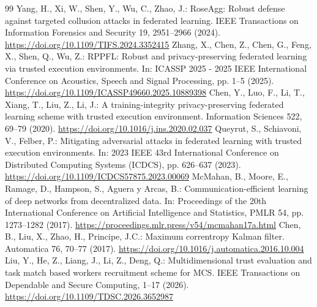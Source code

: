 \documentclass[10pt,a4paper,UTF8,fontset=fandol]{ctexart}
\begin{document}
\begin{thebibliography}{99}
     Yang, H., Xi, W., Shen, Y., Wu, C., Zhao, J.: RoseAgg: Robust defense against targeted collusion attacks in federated learning. IEEE Transactions on Information Forensics and Security 19, 2951--2966 (2024). \url{https://doi.org/10.1109/TIFS.2024.3352415}
     Zhang, X., Chen, Z., Chen, G., Feng, X., Shen, Q., Wu, Z.: RPPFL: Robust and privacy-preserving federated learning via trusted execution environments. In: ICASSP 2025 - 2025 IEEE International Conference on Acoustics, Speech and Signal Processing, pp. 1--5 (2025). \url{https://doi.org/10.1109/ICASSP49660.2025.10889398}
     Chen, Y., Luo, F., Li, T., Xiang, T., Liu, Z., Li, J.: A training-integrity privacy-preserving federated learning scheme with trusted execution environment. Information Sciences 522, 69--79 (2020). \url{https://doi.org/10.1016/j.ins.2020.02.037}
     Queyrut, S., Schiavoni, V., Felber, P.: Mitigating adversarial attacks in federated learning with trusted execution environments. In: 2023 IEEE 43rd International Conference on Distributed Computing Systems (ICDCS), pp. 626--637 (2023). \url{https://doi.org/10.1109/ICDCS57875.2023.00069}
     McMahan, B., Moore, E., Ramage, D., Hampson, S., Aguera y Arcas, B.: Communication-efficient learning of deep networks from decentralized data. In: Proceedings of the 20th International Conference on Artificial Intelligence and Statistics, PMLR 54, pp. 1273--1282 (2017). \url{https://proceedings.mlr.press/v54/mcmahan17a.html}
     Chen, B., Liu, X., Zhao, H., Principe, J.C.: Maximum correntropy Kalman filter. Automatica 76, 70--77 (2017). \url{https://doi.org/10.1016/j.automatica.2016.10.004}
     Liu, Y., He, Z., Liang, J., Li, Z., Deng, Q.: Multidimensional trust evaluation and task match based workers recruitment scheme for MCS. IEEE Transactions on Dependable and Secure Computing, 1--17 (2026). \url{https://doi.org/10.1109/TDSC.2026.3652987}
\end{thebibliography}
\endgroup
\end{document}
